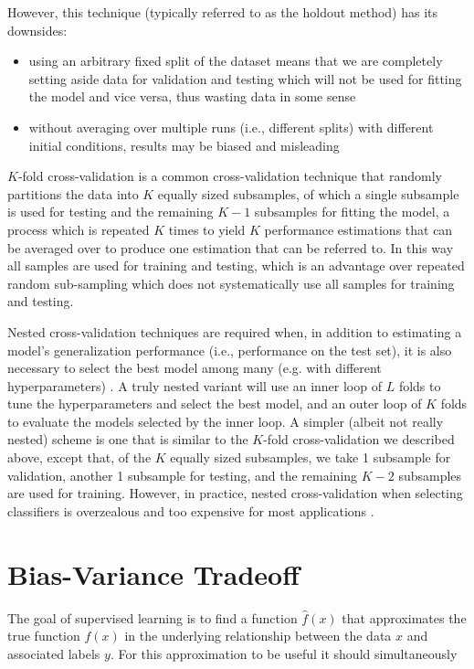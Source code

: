 However, this technique (typically referred to as the holdout method) has its downsides:

\begin{itemize}
    \item using an arbitrary fixed split of the dataset means that we are completely setting aside data for validation and testing which will not be used for fitting the model and vice versa, thus wasting data in some sense
    \item without averaging over multiple runs (i.e., different splits) with different initial conditions, results may be biased and misleading
\end{itemize}

$K$-fold cross-validation is a common cross-validation technique that randomly partitions the data into $K$ equally sized subsamples, of which a single subsample is used for testing and the remaining $K-1$ subsamples for fitting the model, a process which is repeated $K$ times to yield $K$ performance estimations that can be averaged over to produce one estimation that can be referred to. In this way all samples are used for training and testing, which is an advantage over repeated random sub-sampling which does not systematically use all samples for training and testing.

Nested cross-validation techniques are required when, in addition to estimating a model's generalization performance (i.e., performance on the test set), it is also necessary to select the best model among many (e.g. with different hyperparameters) \cite{crossvalidationbias}. A truly nested variant will use an inner loop of $L$ folds to tune the hyperparameters and select the best model, and an outer loop of $K$ folds to evaluate the models selected by the inner loop. A simpler (albeit not really nested) scheme is one that is similar to the $K$-fold cross-validation we described above, except that, of the $K$ equally sized subsamples, we take 1 subsample for validation, another 1 subsample for testing, and the remaining $K-2$ subsamples are used for training. However, in practice, nested cross-validation when selecting classifiers is overzealous and too expensive for most applications \cite{nestedcvoverzealous}.

\section{Bias-Variance Tradeoff}

The goal of supervised learning is to find a function $\hat{f}(x)$ that approximates the true function $f(x)$ in the underlying relationship between the data $x$ and associated labels $y$. For this approximation to be useful it should simultaneously

